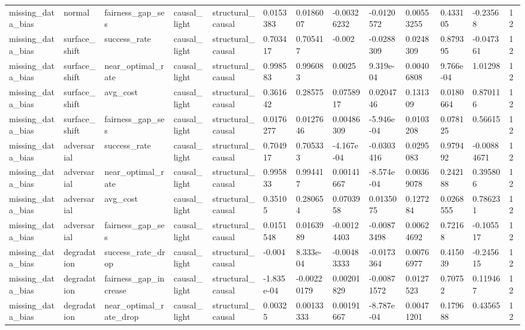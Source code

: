 \begin{tabular}{lllllllllllll}
missing\_data\_bias & normal & fairness\_gap\_ses & causal\_light & structural\_causal & 0.0153383 & 0.0186007 & -0.00326232 & -0.0120572 & 0.00553255 & 0.433105 & -0.23568 & 12 \\
missing\_data\_bias & surface\_shift & success\_rate & causal\_light & structural\_causal & 0.703417 & 0.705417 & -0.002 & -0.0288309 & 0.0248309 & 0.879395 & -0.047361 & 12 \\
missing\_data\_bias & surface\_shift & near\_optimal\_rate & causal\_light & structural\_causal & 0.998583 & 0.996083 & 0.0025 & 9.319e-04 & 0.00406808 & 9.766e-04 & 1.01298 & 12 \\
missing\_data\_bias & surface\_shift & avg\_cost & causal\_light & structural\_causal & 0.361642 & 0.28575 & 0.0758917 & 0.0204746 & 0.131309 & 0.0180664 & 0.870116 & 12 \\
missing\_data\_bias & surface\_shift & fairness\_gap\_ses & causal\_light & structural\_causal & 0.0176277 & 0.0127646 & 0.00486309 & -5.946e-04 & 0.0103208 & 0.078125 & 0.56615 & 12 \\
missing\_data\_bias & adversarial & success\_rate & causal\_light & structural\_causal & 0.704917 & 0.705333 & -4.167e-04 & -0.0303416 & 0.0295083 & 0.979492 & -0.00884671 & 12 \\
missing\_data\_bias & adversarial & near\_optimal\_rate & causal\_light & structural\_causal & 0.995833 & 0.994417 & 0.00141667 & -8.574e-04 & 0.00369078 & 0.242188 & 0.395806 & 12 \\
missing\_data\_bias & adversarial & avg\_cost & causal\_light & structural\_causal & 0.35105 & 0.280654 & 0.0703958 & 0.0135075 & 0.127284 & 0.0268555 & 0.786231 & 12 \\
missing\_data\_bias & adversarial & fairness\_gap\_ses & causal\_light & structural\_causal & 0.0151548 & 0.0163989 & -0.00124403 & -0.00873498 & 0.00624692 & 0.72168 & -0.105517 & 12 \\
missing\_data\_bias & degradation & success\_rate\_drop & causal\_light & structural\_causal & -0.004 & 8.333e-04 & -0.00483333 & -0.0173364 & 0.00766977 & 0.415039 & -0.245615 & 12 \\
missing\_data\_bias & degradation & fairness\_gap\_increase & causal\_light & structural\_causal & -1.835e-04 & -0.00220179 & 0.00201829 & -0.00871572 & 0.0127523 & 0.70752 & 0.119467 & 12 \\
missing\_data\_bias & degradation & near\_optimal\_rate\_drop & causal\_light & structural\_causal & 0.00325 & 0.00133333 & 0.00191667 & -8.787e-04 & 0.00471201 & 0.179688 & 0.43565 & 12 \\

\end{tabular}

